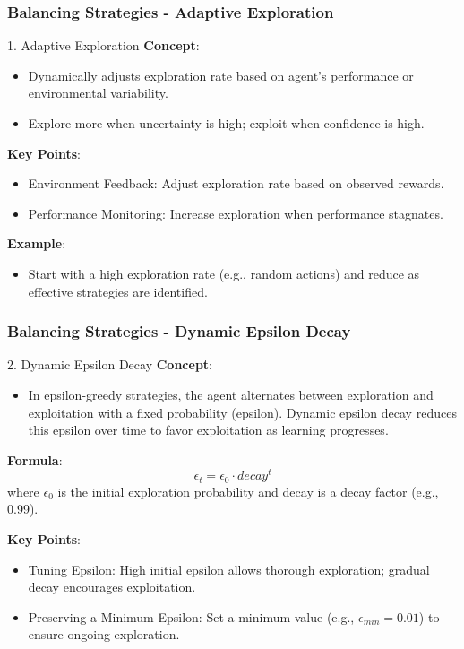 \documentclass[aspectratio=169]{beamer}
\begin{document}
\begin{frame}[fragile]
    \frametitle{Balancing Strategies - Adaptive Exploration}
    \begin{block}{1. Adaptive Exploration}
        \textbf{Concept}:
        \begin{itemize}
            \item Dynamically adjusts exploration rate based on 
            agent's performance or environmental variability.
            \item Explore more when uncertainty is high; exploit when confidence is high.
        \end{itemize}

        \textbf{Key Points}:
        \begin{itemize}
            \item Environment Feedback: Adjust exploration rate based on observed rewards.
            \item Performance Monitoring: Increase exploration when performance stagnates.
        \end{itemize}

        \textbf{Example}:
        \begin{itemize}
            \item Start with a high exploration rate (e.g., random actions) and 
            reduce as effective strategies are identified.
        \end{itemize}
    \end{block}
\end{frame}

\begin{frame}[fragile]
    \frametitle{Balancing Strategies - Dynamic Epsilon Decay}
    \begin{block}{2. Dynamic Epsilon Decay}
        \textbf{Concept}:
        \begin{itemize}
            \item In epsilon-greedy strategies, the agent alternates between exploration and 
            exploitation with a fixed probability (epsilon). Dynamic epsilon decay 
            reduces this epsilon over time to favor exploitation as learning progresses.
        \end{itemize}

        \textbf{Formula}:
        \begin{equation}
            \epsilon_t = \epsilon_0 \cdot decay^t
        \end{equation}
        where \( \epsilon_0 \) is the initial exploration probability and decay is a decay factor (e.g., 0.99).

        \textbf{Key Points}:
        \begin{itemize}
            \item Tuning Epsilon: High initial epsilon allows thorough exploration; 
            gradual decay encourages exploitation.
            \item Preserving a Minimum Epsilon: Set a minimum value (e.g., 
            \(\epsilon_{min} = 0.01\)) to ensure ongoing exploration.
        \end{itemize}
    \end{block}
\end{frame}
\end{document}
